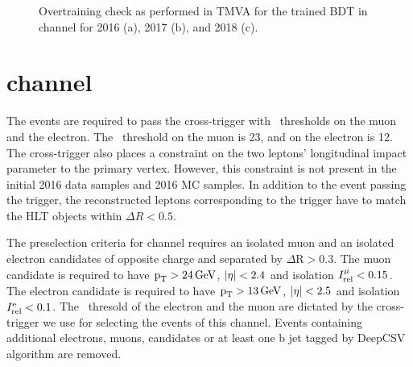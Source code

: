 \begin{figure}[htbp]
  \centering
  \caption{Overtraining check as performed in TMVA for the trained BDT in \Hmuhad channel for 2016 (a), 2017 (b), and 2018 (c).}
  \label{fig:mutauh_bdttrain}
\end{figure}



\section{\texorpdfstring{\Hmue}{Hmutaue} channel}
The events are required to pass the cross-trigger with \pt\, thresholds on the muon and the electron. The \pt\, threshold on the muon is 23\GeV, and on the electron is 12\GeV. The cross-trigger also places a constraint on the two leptons' longitudinal impact parameter to the primary vertex. However, this constraint is not present in the initial 2016 data samples and 2016 MC samples. In addition to the event passing the trigger, the reconstructed leptons corresponding to the trigger have to match the HLT objects within $\Delta R < 0.5$.

The preselection criteria for \Hmue channel requires an isolated muon and an isolated electron candidates of opposite charge and separated by $\Delta\text{R} > 0.3$. The muon candidate is required to have $\text{p}_\text{T} > 24\,\text{Ge\hspace{-.08em}V}$, $\lvert\eta\rvert < 2.4$ and isolation $I^{\mu}_\text{rel} < 0.15$. The electron candidate is required to have $\text{p}_\text{T} > 13\,\text{Ge\hspace{-.08em}V}$, $\lvert\eta\rvert < 2.5$ and isolation $I^{\text{e}}_\text{rel} < 0.1$. The \pt\, thresold of the electron and the muon are dictated by the cross-trigger we use for selecting the events of this channel. Events containing additional electrons, muons, \tauh candidates or at least one b jet tagged by DeepCSV algorithm are removed.


